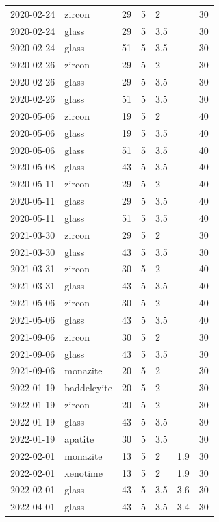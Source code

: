 \begin{longtable}{p{} p{} p{} p{} p{} p{} p{}}
  2020-02-24 & zircon  & 29 & 5 & 2 &  & 30 \\
  2020-02-24 & glass & 29 & 5 & 3.5 &  & 30 \\
  2020-02-24 & glass & 51 & 5 & 3.5 &  & 30 \\
  2020-02-26 & zircon & 29 & 5 & 2 &  & 30 \\
  2020-02-26 & glass & 29 & 5 & 3.5 &  & 30 \\
  2020-02-26 & glass & 51 & 5 & 3.5 &  & 30 \\
  2020-05-06 & zircon & 19 & 5 & 2 &  & 40 \\
  2020-05-06 & glass & 19 & 5 & 3.5 &  & 40 \\
  2020-05-06 & glass & 51 & 5 & 3.5 &  & 40 \\
  2020-05-08 & glass & 43 & 5 & 3.5 &  & 40 \\
  2020-05-11 & zircon & 29 & 5 & 2 &  & 40 \\
  2020-05-11 & glass & 29 & 5 & 3.5 &  & 40 \\
  2020-05-11 & glass & 51 & 5 & 3.5 &  & 40 \\
  2021-03-30 & zircon & 29 & 5 & 2 &  & 30 \\
  2021-03-30 & glass & 43 & 5 & 3.5 &  & 30 \\
  2021-03-31 & zircon & 30 & 5 & 2 &  & 40 \\
  2021-03-31 & glass & 43 & 5 & 3.5 &  & 40 \\
  2021-05-06 & zircon & 30 & 5 & 2 &  & 40 \\
  2021-05-06 & glass & 43 & 5 & 3.5 &  & 40 \\
  2021-09-06 & zircon & 30 & 5 & 2 &  & 30 \\
  2021-09-06 & glass & 43 & 5 & 3.5 &  & 30 \\
  2021-09-06 & monazite & 20 & 5 & 2 & & 30 \\
  2022-01-19 & baddeleyite & 20 & 5 & 2 & & 30 \\
  2022-01-19 & zircon & 20 & 5 & 2 & & 30 \\
  2022-01-19 & glass & 43 & 5 & 3.5 & & 30 \\
  2022-01-19 & apatite & 30 & 5 & 3.5  &  & 30 \\
  2022-02-01 & monazite & 13 & 5 & 2 & 1.9  & 30 \\
  2022-02-01 & xenotime & 13 & 5 & 2 & 1.9  & 30 \\
  2022-02-01 & glass & 43 & 5 & 3.5 & 3.6  & 30 \\
  2022-04-01 & glass & 43 & 5 & 3.5 & 3.4  & 30 \\

\end{longtable}
